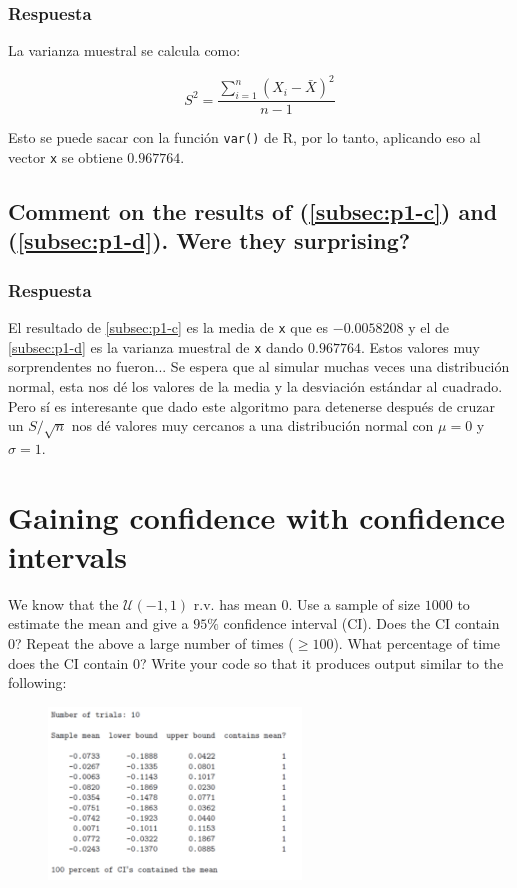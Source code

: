 \documentclass[12pt]{article}\usepackage[]{graphicx}\usepackage[]{xcolor}
\begin{document}
\subsubsection{Respuesta}

La varianza muestral se calcula como:

\[
S^{2} = \frac{\sum_{i=1}^{n} (X_{i} - \bar{X})^{2}}{n-1}
\]

Esto se puede sacar con la función \lstinline|var()| de \textsf{R}, por lo tanto, aplicando eso al vector \lstinline|x| se obtiene $0.967764$.



\subsection{Comment on the results of (\ref{subsec:p1-c}) and (\ref{subsec:p1-d}). Were they surprising?}
\label{subsec:p1-e}

\subsubsection{Respuesta}

El resultado de \ref{subsec:p1-c} es la media de \lstinline|x| que es $-0.0058208$ y el de \ref{subsec:p1-d} es la varianza muestral de \lstinline|x| dando $0.967764$. Estos valores muy sorprendentes no fueron... Se espera que al simular muchas veces una distribución normal, esta nos dé los valores de la media y la desviación estándar al cuadrado. Pero sí es interesante que dado este algoritmo para detenerse después de cruzar un $S / \sqrt{n}$ nos dé valores muy cercanos a una distribución normal con $\mu = 0$ y $\sigma = 1$.


\newpage

\section{Gaining confidence with confidence intervals}

We know that the $\mathcal{U}(-1, 1)$ r.v. has mean 0. Use a sample of size $1000$ to estimate the mean and give a $95\%$ confidence interval (CI). Does the CI contain 0? Repeat the above a large number of times ($\geq  100$). What percentage of time does the CI contain 0? Write your code so that it produces output similar to the following:

\begin{figure}[ht]
  \centering
  \includegraphics[width=0.6\textwidth]{img/Punto2.png}
\end{figure}
\end{document}

